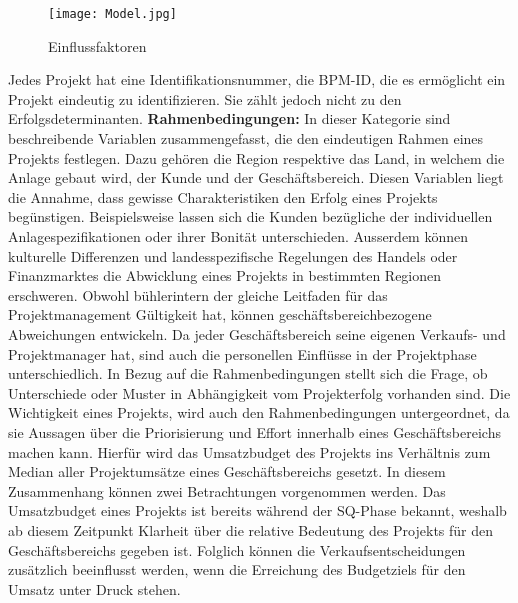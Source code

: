 \newline
\begin{figure}[ht!]
\centering
\texttt{[image: Model.jpg]}
\caption{Einflussfaktoren \label{Einflussfaktoren}}
\end{figure}
\newline
Jedes Projekt hat eine Identifikationsnummer, die BPM-ID, die es ermöglicht ein Projekt eindeutig zu identifizieren. Sie zählt jedoch nicht zu den Erfolgsdeterminanten.
\newline
\newline\textbf{Rahmenbedingungen:} In dieser Kategorie sind beschreibende Variablen zusammengefasst, die den eindeutigen Rahmen eines Projekts festlegen. Dazu gehören die Region respektive das Land, in welchem die Anlage gebaut wird, der Kunde und der Geschäftsbereich. Diesen Variablen liegt die Annahme, dass gewisse Charakteristiken den Erfolg eines Projekts begünstigen. Beispielsweise lassen sich die Kunden bezügliche der individuellen Anlagespezifikationen oder ihrer Bonität unterschieden. Ausserdem können kulturelle Differenzen und landesspezifische Regelungen des Handels oder Finanzmarktes die Abwicklung eines Projekts in bestimmten Regionen erschweren. Obwohl bühlerintern der gleiche Leitfaden für das Projektmanagement Gültigkeit hat, können geschäftsbereichbezogene Abweichungen entwickeln. Da jeder Geschäftsbereich seine eigenen Verkaufs- und Projektmanager hat, sind auch die personellen Einflüsse in der Projektphase unterschiedlich. In Bezug auf die Rahmenbedingungen stellt sich die Frage, ob Unterschiede oder Muster in Abhängigkeit vom Projekterfolg vorhanden sind. Die Wichtigkeit eines Projekts, wird auch den Rahmenbedingungen untergeordnet, da sie Aussagen über die Priorisierung und Effort innerhalb eines Geschäftsbereichs machen kann. Hierfür wird das Umsatzbudget des Projekts ins Verhältnis zum Median aller Projektumsätze eines Geschäftsbereichs gesetzt. In diesem Zusammenhang können zwei Betrachtungen vorgenommen werden. Das Umsatzbudget eines Projekts ist bereits während der SQ-Phase bekannt, weshalb ab diesem Zeitpunkt Klarheit über die relative Bedeutung des Projekts für den Geschäftsbereichs gegeben ist. Folglich können die Verkaufsentscheidungen zusätzlich beeinflusst werden, wenn die Erreichung des Budgetziels für den Umsatz unter Druck stehen. 
